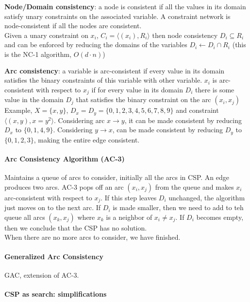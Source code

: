 \documentclass[10pt]{report}
\begin{document}
\begin{list}{}{} 
	\item \textbf{Node/Domain consistency}: a node is consistent if all the values in its domain satisfy unary constraints on the associated variable. A constraint network is node-consistent if all the nodes are consistent.\\
	Given a unary constraint on $x_i$, $C_i = \langle(x_i), R_i\rangle$ then node consistency $D_i \subseteq R_i$ and can be enforced by reducing the domains of the variables $D_i \leftarrow D_i \cap R_i$ (this is the NC-1 algorithm, $O(d\cdot n)$)
	\item \textbf{Arc consistency}: a variable is arc-consistent if every value in its domain satisfies the binary constraints of this variable with other variable. $x_i$ is arc-consistent with respect to $x_j$ if for every value in its domain $D_i$ there is some value in the domain $D_j$ that satisfies the binary constraint on the arc $(x_i, x_j)$\\
	Example, $X = \{x, y\}$, $D_x = D_y = \{0,1,2,3,4,5,6,7,8,9\}$ and constraint $\langle(x,y), x=y^2\rangle$. Considering arc $x \rightarrow y$, it can be made consistent by reducing $D_x$ to $\{0,1,4,9\}$. Considering $y \rightarrow x$, can be made consistent by reducing $D_y$ to $\{0,1,2,3\}$, making the entire edge consistent.
\end{list}
\paragraph{Arc Consistency Algorithm (AC-3)} Maintains a queue of arcs to consider, initially all the arcs in CSP. An edge produces two arcs. AC-3 pops off an arc $(x_i, x_j)$ from the queue and makes $x_i$ arc-consistent with respect to $x_j$. If this step leaves $D_i$ unchanged, the algorithm just moves on to the next arc. If $D_i$ is made smaller, then we need to add to teh queue all arcs $(x_k, x_j)$ where $x_k$ is a neighbor of $x_i \neq x_j$. If $D_i$ becomes empty, then we conclude that the CSP has no solution.\\
When there are no more arcs to consider, we have finished.
\paragraph{Generalized Arc Consistency} GAC, extension of AC-3.
\paragraph{CSP as search: simplifications}
\end{document}
